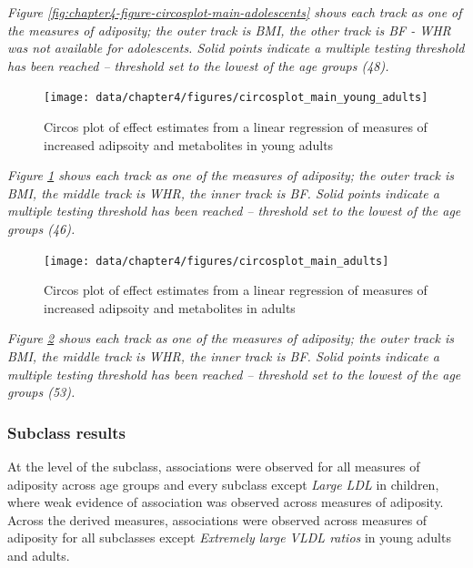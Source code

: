 \documentclass[11pt,twoside]{bristolthesis}
\newcommand{\bsmall}{\begin{small}}
\newcommand{\esmall}{\end{small}}
\begin{document}
\noindent 
\bsmall
\emph{Figure \ref{fig:chapter4-figure-circosplot-main-adolescents} shows each track as one of the measures of adiposity; the outer track is BMI, the other track is BF - WHR was not available for adolescents. Solid points indicate a multiple testing threshold has been reached -- threshold set to the lowest of the age groups (48).}
\esmall
\begin{figure}
\texttt{[image: data/chapter4/figures/circosplot\_main\_young\_adults]} \caption{Circos plot of effect estimates from a linear regression of measures of increased adipsoity and metabolites in young adults}\label{fig:chapter4-figure-circosplot-main-young-adults}
\end{figure}
\noindent 
\bsmall
\emph{Figure \ref{fig:chapter4-figure-circosplot-main-young-adults} shows each track as one of the measures of adiposity; the outer track is BMI, the middle track is WHR, the inner track is BF. Solid points indicate a multiple testing threshold has been reached -- threshold set to the lowest of the age groups (46).}
\esmall
\begin{figure}
\texttt{[image: data/chapter4/figures/circosplot\_main\_adults]} \caption{Circos plot of effect estimates from a linear regression of measures of increased adipsoity and metabolites in adults}\label{fig:chapter4-figure-circosplot-main-adults}
\end{figure}
\noindent 
\bsmall
\emph{Figure \ref{fig:chapter4-figure-circosplot-main-adults} shows each track as one of the measures of adiposity; the outer track is BMI, the middle track is WHR, the inner track is BF. Solid points indicate a multiple testing threshold has been reached -- threshold set to the lowest of the age groups (53).}
\esmall

\hypertarget{subclass-results}{%
\subsubsection{Subclass results}\label{subclass-results}}

At the level of the subclass, associations were observed for all measures of adiposity across age groups and every subclass except \emph{Large LDL} in children, where weak evidence of association was observed across measures of adiposity. Across the derived measures, associations were observed across measures of adiposity for all subclasses except \emph{Extremely large VLDL ratios} in young adults and adults.
\end{document}

